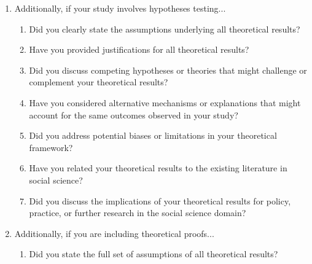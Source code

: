 \documentclass[letterpaper]{article} %
\begin{document}
\begin{enumerate}
\begin{enumerate}
  \item Have you read the ethics review guidelines and ensured that your paper conforms to them?
    
\end{enumerate}

\item Additionally, if your study involves hypotheses testing...
\begin{enumerate}
  \item Did you clearly state the assumptions underlying all theoretical results?
    

  \item Have you provided justifications for all theoretical results?
    

  \item Did you discuss competing hypotheses or theories that might challenge or complement your theoretical results?
    

  \item Have you considered alternative mechanisms or explanations that might account for the same outcomes observed in your study?
    

  \item Did you address potential biases or limitations in your theoretical framework?
    

  \item Have you related your theoretical results to the existing literature in social science?
    

  \item Did you discuss the implications of your theoretical results for policy, practice, or further research in the social science domain?
    
\end{enumerate}

\item Additionally, if you are including theoretical proofs...
\begin{enumerate}
  \item Did you state the full set of assumptions of all theoretical results?
    

\end{enumerate}
\end{enumerate}
\end{document}
